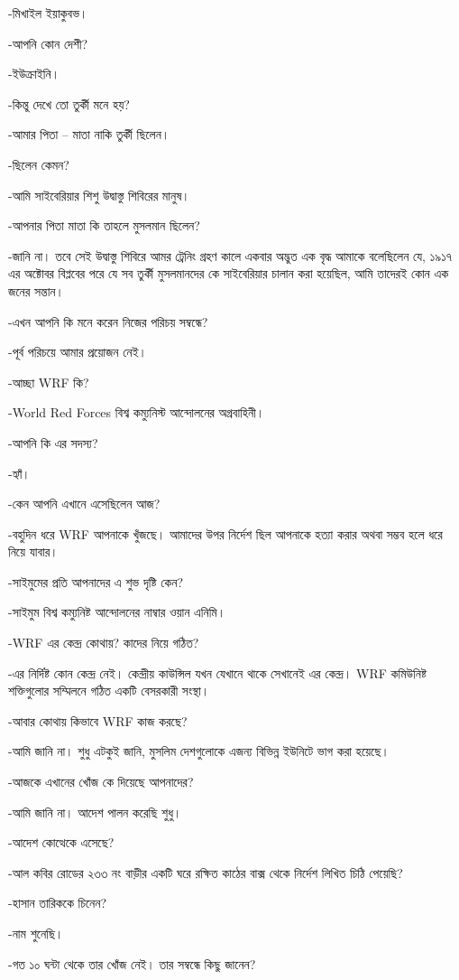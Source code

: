 \documentclass[
]{book}
\begin{document}
-মিখাইল ইয়াকুবভ।

-আপনি কোন দেশী?

-ইউক্রাইনি।

-কিন্তু দেখে তো তুর্কী মনে হয়?

-আমার পিতা -- মাতা নাকি তুর্কী ছিলেন।

-ছিলেন কেমন?

-আমি সাইবেরিয়ার শিশু উদ্বাস্তু শিবিরের মানুষ।

-আপনার পিতা মাতা কি তাহলে মুসলমান ছিলেন?

-জানি না। তবে সেই উদ্বাস্তু শিবিরে আমর ট্রেনিং গ্রহণ কালে একবার অদ্ভুত এক বৃদ্ধ আমাকে বলেছিলেন যে, ১৯১৭ এর অক্টোবর বিপ্লবের পরে যে সব তুর্কী মুসলমানদের কে সাইবেরিয়ার চালান করা হয়েছিল, আমি তাদেরই কোন এক জনের সন্তান।

-এখন আপনি কি মনে করেন নিজের পরিচয় সম্বন্ধে?

-পূর্ব পরিচয়ে আমার প্রয়োজন নেই।

-আচ্ছা WRF কি?

-World Red Forces বিশ্ব কম্যুনিস্ট আন্দোলনের অগ্রবাহিনী।

-আপনি কি এর সদস্য?

-হ্যাঁ।

-কেন আপনি এখানে এসেছিলেন আজ?

-বহুদিন ধরে WRF আপনাকে খুঁজছে। আমাদের উপর নির্দেশ ছিল আপনাকে হত্যা করার অথবা সম্ভব হলে ধরে নিয়ে যাবার।

-সাইমুমের প্রতি আপনাদের এ শুভ দৃষ্টি কেন?

-সাইমুম বিশ্ব কম্যুনিষ্ট আন্দোলনের নাম্বার ওয়ান এনিমি।

-WRF এর কেন্দ্র কোথায়? কাদের নিয়ে গঠিত?

-এর নির্দিষ্ট কোন কেন্দ্র নেই। কেন্দ্রীয় কাউন্সিল যখন যেখানে থাকে সেখানেই এর কেন্দ্র। WRF কমিউনিষ্ট শক্তিগুলোর সম্মিলনে গঠিত একটি বেসরকারী সংস্থা।

-আবার কোথায় কিভাবে WRF কাজ করছে?

-আমি জানি না। শুধু এটকুই জানি, মুসলিম দেশগুলোকে এজন্য বিভিন্ন ইউনিটে ভাগ করা হয়েছে।

-আজকে এখানের খোঁজ কে দিয়েছে আপনাদের?

-আমি জানি না। আদেশ পালন করেছি শুধু।

-আদেশ কোত্থেকে এসেছে?

-আল কবির রোডের ২৩৩ নং বাড়ীর একটি ঘরে রক্ষিত কাঠের বাক্স থেকে নির্দেশ লিখিত চিঠি পেয়েছি?

-হাসান তারিককে চিনেন?

-নাম শুনেছি।

-গত ১০ ঘন্টা থেকে তার খোঁজ নেই। তার সম্বন্ধে কিছু জানেন?
\end{document}
